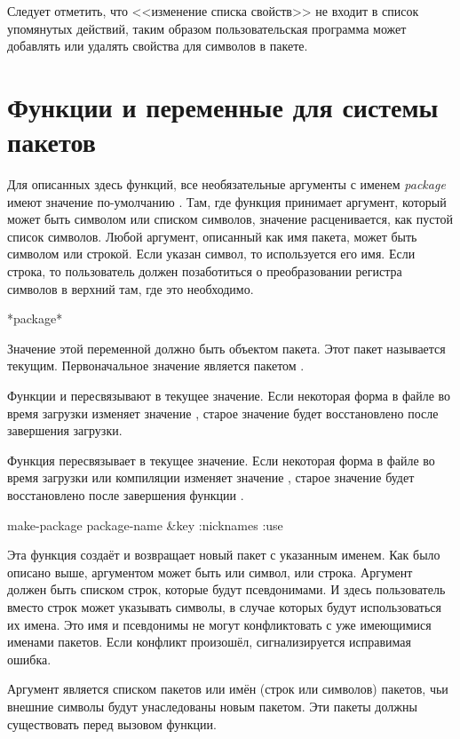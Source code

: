 Следует отметить, что <<изменение списка свойств>> не входит в список упомянутых
действий, таким образом пользовательская программа может добавлять или удалять
свойства для символов в  пакете.

\section{Функции и переменные для системы пакетов}
\label{PACKAGE-FUNCTIONS-SECTION}

Для описанных здесь функций, все необязательные аргументы с именем
\emph{package} имеют значение по-умолчанию . Там, где
функция принимает аргумент, который может быть символом или списком
символов, значение {\false} расценивается, как пустой список
символов. Любой аргумент, описанный как имя пакета, может быть
символом или строкой.  Если указан символ, то используется его
имя. Если строка, то пользователь должен позаботиться о преобразовании
регистра символов в верхний там, где это необходимо.

\begin{defun}[Переменная]
*package*

Значение этой переменной должно быть объектом пакета. Этот пакет называется
текущим. Первоначальное значение  является пакетом .

Функции  и  пересвязывают  в текущее значение. Если
некоторая форма в файле во время загрузки изменяет значение ,
старое значение будет восстановлено после завершения загрузки.

Функция  пересвязывает  в текущее
значение. Если некоторая форма в файле во время загрузки или компиляции изменяет
значение , старое значение будет восстановлено после
завершения функции .
\end{defun}

\begin{defun}[Функция]
make-package package-name &key :nicknames :use

Эта функция создаёт и возвращает новый пакет с указанным именем. Как было
описано выше, аргументом может быть или символ, или строка. Аргумент
 должен быть списком строк, которые будут псевдонимами. И здесь
пользователь вместо строк может указывать символы, в случае которых будут
использоваться их имена. Это имя и псевдонимы не могут конфликтовать с
уже имеющимися именами пакетов. Если конфликт произошёл,
сигнализируется исправимая ошибка.

Аргумент  является списком пакетов или имён (строк или символов)
пакетов, чьи внешние символы будут унаследованы новым пакетом. Эти пакеты должны
существовать перед вызовом функции. 
\end{defun}


